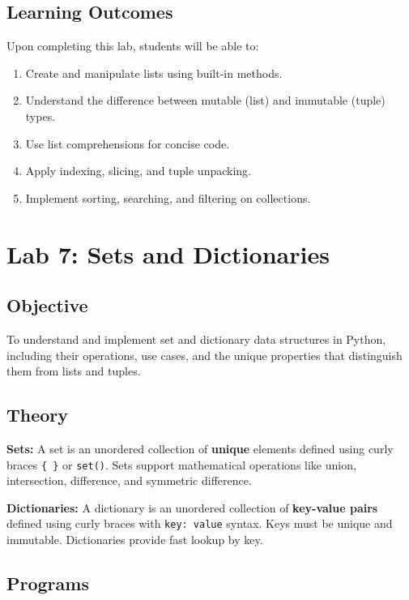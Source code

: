 \documentclass[12pt,a4paper]{article}
\begin{document}
\subsection{Learning Outcomes}
Upon completing this lab, students will be able to:
\begin{enumerate}
  \item Create and manipulate lists using built-in methods.
  \item Understand the difference between mutable (list) and immutable (tuple) types.
  \item Use list comprehensions for concise code.
  \item Apply indexing, slicing, and tuple unpacking.
  \item Implement sorting, searching, and filtering on collections.
\end{enumerate}

\newpage

\section{Lab 7: Sets and Dictionaries}

\subsection{Objective}
To understand and implement set and dictionary data structures in Python, including their operations, use cases, and the unique properties that distinguish them from lists and tuples.

\subsection{Theory}

\textbf{Sets:}
A set is an unordered collection of \textbf{unique} elements defined using curly braces \texttt{\{ \}} or \texttt{set()}. Sets support mathematical operations like union, intersection, difference, and symmetric difference.

\textbf{Dictionaries:}
A dictionary is an unordered collection of \textbf{key-value pairs} defined using curly braces with \texttt{key: value} syntax. Keys must be unique and immutable. Dictionaries provide fast lookup by key.

\subsection{Programs}
\end{document}
